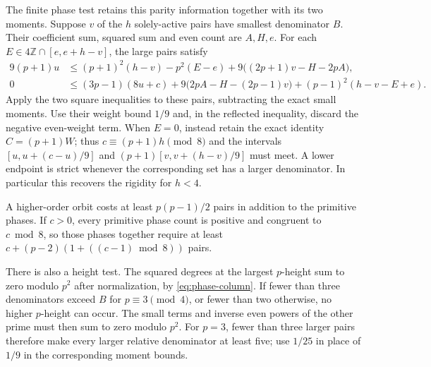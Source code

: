 \documentclass[11pt]{amsart}
\numberwithin{equation}{section}
\theoremstyle{definition}
\theoremstyle{plain}
\newcommand{\ZZ}{\mathbb Z}
\begin{document}
The finite phase test retains this parity information together with
its two moments. Suppose $v$ of the $h$ solely-active pairs have
smallest denominator $B$. Their coefficient sum, squared sum and
even count are $A,H,e$. For each $E\in4\ZZ\cap[e,e+h-v]$, the
large pairs satisfy
\[
 \begin{aligned}
 9(p+1)u&\le (p+1)^2(h-v)-p^2(E-e)
       +9\bigl((2p+1)v-H-2pA\bigr),\\
 0&\le(3p-1)(8u+c)+9\bigl(2pA-H-(2p-1)v\bigr)
          +(p-1)^2(h-v-E+e).
 \end{aligned}
\]
Apply the two square inequalities to these pairs, subtracting the
exact small moments. Use their weight bound $1/9$ and, in the
reflected inequality, discard the negative even-weight term.
When $E=0$, instead retain the exact identity $C=(p+1)W$;
thus $c\equiv(p+1)h\pmod8$ and the intervals
$[u,u+(c-u)/9]$ and $(p+1)[v,v+(h-v)/9]$ must meet. A lower
endpoint is strict whenever the corresponding set has a larger
denominator. In particular this recovers the rigidity for $h<4$.


A higher-order orbit costs at least $p(p-1)/2$ pairs in addition to
the primitive phases. If $c>0$, every primitive phase count is
positive and congruent to $c\bmod8$, so those phases together
require at least $c+(p-2)(1+((c-1)\bmod8))$ pairs.



There is also a height test. The squared degrees at the largest
$p$-height sum to zero modulo $p^2$ after normalization, by
\eqref{eq:phase-column}. If fewer than three denominators exceed $B$
for $p\equiv3\pmod4$, or fewer than two otherwise, no higher
$p$-height can occur. The small terms and inverse even powers of
the other prime must then sum to zero modulo $p^2$.
For $p=3$, fewer than three larger pairs therefore make every
larger relative denominator at least five; use $1/25$ in place of
$1/9$ in the corresponding moment bounds.
\end{document}
